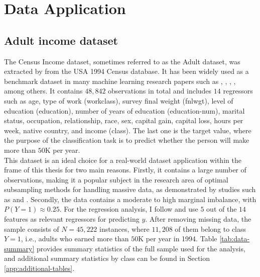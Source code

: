 \section{Data Application}
\label{sec:data}
\subsection{Adult income dataset}

The Census Income dataset, sometimes referred to as the Adult dataset, was extracted by \textcite{misc_adult_2} from the USA 1994 Census database. It has been widely used as a benchmark dataset in many machine learning research papers such as \textcite{poulos2018}, \textcite{chawla2002smote}, \textcite{menardi2014}, \textcite{yao2021review}, among others. It contains $48,842$ observations in total and includes $14$ regressors such as age, type of work (workclass), survey final weight (fnlwgt), level of education (education), number of years of education (education-num), marital status, occupation, relationship, race, sex, capital gain, capital loss, hours per week, native country, and income (class). The last one is the target value, where the purpose of the classification task is to predict whether the person will make more than $50$K per year.\\

This dataset is an ideal choice for a real-world dataset application within the frame of this thesis for two main reasons. Firstly, it contains a large number of observations, making it a popular subject in the research area of optimal subsampling methods for handling massive data, as demonstrated by studies such as \textcite{wang2018optimal} and \textcite{yao2021review}. Secondly, the data contains a moderate to high marginal imbalance, with $P(Y=1) \approx 0.25$. For the regression analysis, I follow \textcite{yao2021review} and use $5$ out of the $14$ features as relevant regressors for predicting $y$. After removing missing data, the sample consists of $N=45,222$ instances, where $11,208$ of them belong to class $Y=1$, i.e., adults who earned more than $50$K per year in 1994. Table \ref{tab:data-summary} provides summary statistics of the full sample used for the analysis, and additional summary statistics by class can be found in Section \ref{app:additional-tables}.

